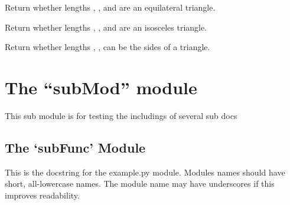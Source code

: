 \documentclass[letterpaper,10pt,english]{sphinxmanual}
\begin{document}

\begin{fulllineitems}
\label{\detokenize{api:trianglelib.utils.is_equilateral}}
Return whether lengths , , and  are an equilateral triangle.

\end{fulllineitems}


\begin{fulllineitems}
\label{\detokenize{api:trianglelib.utils.is_isosceles}}
Return whether lengths , , and  are an isosceles triangle.

\end{fulllineitems}


\begin{fulllineitems}
\label{\detokenize{api:trianglelib.utils.is_triangle}}
Return whether lengths , ,  can be the sides of a triangle.

\end{fulllineitems}



\chapter{The “subMod” module}
\label{\detokenize{subMod:the-submod-module}}\label{\detokenize{subMod::doc}}\label{\detokenize{subMod:module-trianglelib.subMod}}
This sub module is for testing the includings of several sub docs


\section{The ‘subFunc’ Module}
\label{\detokenize{subMod:module-trianglelib.subMod.subFunc}}\label{\detokenize{subMod:the-subfunc-module}}
This is the docstring for the example.py module.  Modules names should
have short, all-lowercase names.  The module name may have underscores if
this improves readability.
\end{document}
